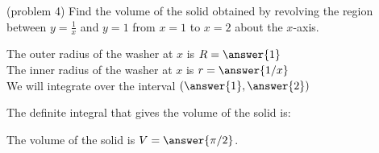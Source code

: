 \documentclass{ximera}
\begin{document}
\begin{problem}(problem 4)
Find the volume of the solid obtained by revolving the region between $y= \frac{1}{x}$ and $y = 1$ from $x = 1$ to $x = 2$ about the $x$-axis.


The outer radius of the washer at $x$ is $R = \answer{1}$\\
The inner radius of the washer at $x$ is $r = \answer{1/x}$\\

We will integrate over the interval $\left(\answer{1},\answer{2}\right)$

The definite integral that gives the volume of the solid is:\\
\begin{multipleChoice}
\end{multipleChoice}

The volume of the solid is $V = \answer{\pi/2 }$.

\end{problem}
\end{document}
